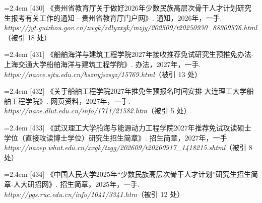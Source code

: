 {\vspace{0.6pt}
\noindent\hangindent=2.4em \label{src:S0573}{\color{cAccent}[430]} 《贵州省教育厅关于做好2026年少数民族高层次骨干人才计划研究生报考有关工作的通知 - 贵州省教育厅门户网》. 通知，2026年，一手. \textit{https://jyt.guizhou.gov.cn/zwgk/zdlyxxgk/mzjy/202509/t20250930\_88909576.html}（被引 18 处）\par
\vspace{0.6pt}
\vspace{3.5pt}\par
\nopagebreak\vspace{1pt}
\noindent\hangindent=2.4em \label{src:S0575}{\color{cAccent}[431]} 《船舶海洋与建筑工程学院2027年接收推荐免试研究生预推免办法-上海交通大学船舶海洋与建筑工程学院》. 办法，2027年，一手. \textit{https://naoce.sjtu.edu.cn/bsznyjszsgz/15769.html}（被引 13 处）\par
\vspace{0.6pt}
\vspace{3.5pt}\par
\nopagebreak\vspace{1pt}
\noindent\hangindent=2.4em \label{src:S0576}{\color{cAccent}[432]} 《关于船舶工程学院2027年推免生预报名时间安排-大连理工大学船舶工程学院》. 网页资料，2027年，一手. \textit{https://naoe.dlut.edu.cn/info/1711/21582.htm}（被引 5 处）\par
\vspace{0.6pt}
\vspace{3.5pt}\par
\nopagebreak\vspace{1pt}
\noindent\hangindent=2.4em \label{src:S0577}{\color{cAccent}[433]} 《武汉理工大学船海与能源动力工程学院2027年推荐免试攻读硕士学位（直接攻读博士学位）研究生招生简章》. 招生简章，2027年，一手. \textit{https://naoep.whut.edu.cn/xxgk/tzgg/202609/t20260917\_1418215.shtml}（被引 8 处）\par
\vspace{0.6pt}
\vspace{3.5pt}\par
\nopagebreak\vspace{1pt}
\noindent\hangindent=2.4em \label{src:S0578}{\color{cAccent}[434]} 《中国人民大学2025年“少数民族高层次骨干人才计划”研究生招生简章-人大研招网》. 招生简章，2025年，一手. \textit{https://pgs.ruc.edu.cn/info/1041/3341.htm}（被引 12 处）\par
}
